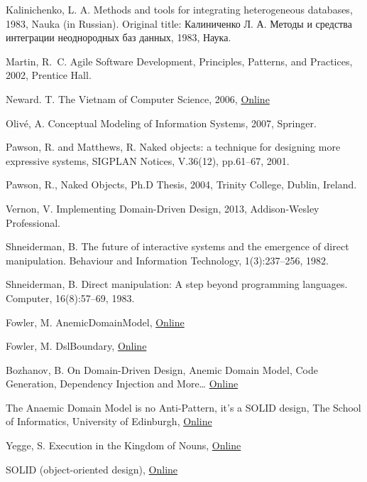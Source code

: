 \documentclass[a4paper,12pt,oneside,openright,final]{memoir} %
\begin{document}
\begin{thebibliography}{5}
Kalinichenko, L. A. Methods and tools for integrating heterogeneous databases, 1983, Nauka (in Russian).
\foreignlanguage{russian}{Original title: Калиниченко Л. А. Методы и средства интеграции неоднородных баз данных, 1983, Наука.}

Martin, R.~C. Agile Software Development, Principles, Patterns, and Practices, 2002, Prentice Hall.

New\-ard. T. The Vietnam of Computer Science, 2006,
\href{http://blogs.tedneward.com/2006/06/26/The+Vietnam+Of+Computer+Science.aspx}{Online}

Oliv\'{e}, A. Conceptual Modeling of Information Systems, 2007, Springer.

Pawson, R. and Matthews, R. Naked objects: a technique for designing more expressive systems, SIGPLAN Notices, V.36(12), pp.61--67, 2001.

Pawson, R., Naked Objects, Ph.D Thesis, 2004, Trinity College, Dublin, Ireland.

Vernon, V. Implementing Domain-Driven Design, 2013, Addison-Wesley Professional.

Shneiderman, B. The future of interactive systems and the emergence of direct manipulation. Behaviour and Information Technology, 1(3):237–256, 1982.

Shneiderman, B. Direct manipulation: A step beyond programming languages. Computer, 16(8):57–69, 1983.

 Fowler, M. AnemicDomainModel, 
\href{http://www.martinfowler.com/bliki/AnemicDomainModel.html}{Online}

 Fowler, M. DslBoundary, 
\href{http://martinfowler.com/bliki/DslBoundary.html}{Online}

 Bozhanov, B. On Domain-Driven Design, Anemic Domain Model, Code Generation, Dependency Injection and More…
\href{http://techblog.bozho.net/on-domain-driven-design-anemic-domain-models-code-generation-dependency-injection-and-more/}{Online}

  The Anaemic Domain Model is no Anti-Pattern, it’s a SOLID design, The School of Informatics, University of Edinburgh,
\href{https://blog.inf.ed.ac.uk/sapm/2014/02/04/the-anaemic-domain-model-is-no-anti-pattern-its-a-solid-design/}{Online}

 Yegge, S. Execution in the Kingdom of Nouns,  
\href{http://steve-yegge.blogspot.com.au/2006/03/execution-in-kingdom-of-nouns.html}{Online}

 SOLID (object-oriented design), 
\href{https://en.wikipedia.org/wiki/SOLID_(object-oriented_design)}{Online}

\end{thebibliography}
%
\end{document}
